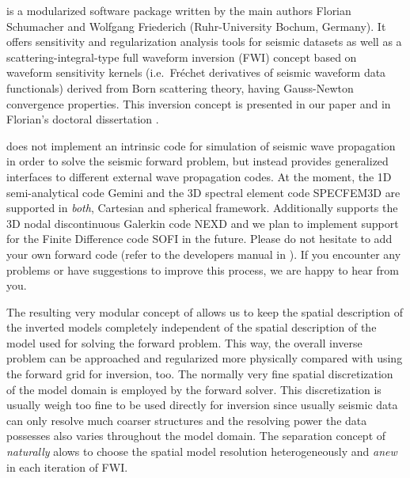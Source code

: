 
%
%
%
\ASKI{} is a modularized software package written by the main authors Florian Schumacher and
Wolfgang Friederich (Ruhr-University Bochum, Germany). It offers sensitivity and regularization 
analysis tools for seismic datasets
as well as a scattering-integral-type full waveform inversion (FWI) concept based on waveform sensitivity 
kernels (i.e.\ Fr\'echet derivatives of seismic waveform data functionals) derived from Born scattering theory,
having Gauss-Newton convergence properties.
This inversion concept is presented in our paper \cite{Schumacher16} and in Florian's doctoral
dissertation \cite{_743d334d-dfa4-4a16-8cc5-91cdadc95271}.

\ASKI{} does not implement an intrinsic code for simulation of seismic wave propagation in order to 
solve the seismic forward problem, but instead provides generalized interfaces to different external wave 
propagation codes. At the moment, the 1D semi-analytical code Gemini \cite{friederich_wd1995} and the 3D spectral 
element code SPECFEM3D \cite{TrKoLi08} are supported in \emph{both}, Cartesian and spherical framework. 
Additionally \ASKI{} supports the 3D nodal discontinuous Galerkin code NEXD \cite{Lambrecht.2015}
and we plan to implement support for the Finite Difference code SOFI \cite{bohlen2002parallel}
in the future. 
Please do not hesitate to add your own forward code (refer to the \ASKI{} developers manual in
). If you encounter any problems or have suggestions to improve this
process, we are happy to hear from you.

The resulting very modular concept of \ASKI{} allows us to keep the spatial description of the inverted 
models completely independent of the spatial description of the model used for solving the forward 
problem. This way, the overall inverse problem can be approached and regularized more physically compared
with using the forward grid for inversion, too. The normally very fine spatial discretization of the model
domain is employed by the forward solver. This discretization is usually weigh too fine to be used
directly for inversion since usually seismic data can only resolve much coarser structures and the
resolving power the data possesses also varies throughout the model domain. 
The separation concept of \ASKI{} \emph{naturally} alows to choose the spatial model
resolution heterogeneously and \emph{anew} in each iteration of FWI.

